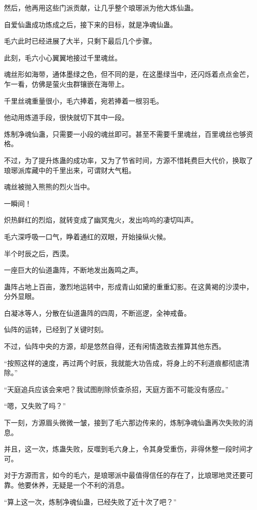 \begin{this_body}
然后，他再用这些门派贡献，让几乎整个琅琊派为他大炼仙蛊。

自爱仙蛊成功炼成之后，接下来的目标，就是净魂仙蛊。

毛六此时已经进展了大半，只剩下最后几个步骤。

此刻，毛六小心翼翼地接过千里魂丝。

魂丝形如海带，通体墨绿之色，但不同的是，在这墨绿当中，还闪烁着点点金芒，乍一看，仿佛是萤火虫群镶嵌在海带上。

千里丝魂重量很小，毛六捧着，宛若捧着一根羽毛。

他动用炼道手段，很快就切下其中一段。

炼制净魂仙蛊，只需要一小段的魂丝即可。甚至不需要千里魂丝，百里魂丝也够资格。

不过，为了提升炼蛊的成功率，又为了节省时间，方源不惜耗费巨大代价，换取了琅琊派库藏中的千里出来，可谓财大气粗。

魂丝被抛入熊熊的烈火当中。

一瞬间！

炽热鲜红的烈焰，就转变成了幽冥鬼火，发出呜呜的凄切叫声。

毛六深呼吸一口气，睁着通红的双眼，开始操纵火候。

半个时辰之后，西漠。

一座巨大的仙道蛊阵，不断地发出轰鸣之声。

蛊阵占地上百亩，激烈地运转中，形成青山如黛的重重幻影。在这黄褐的沙漠中，分外显眼。

白凝冰等人，分散在仙道蛊阵的四周，不断巡逻，全神戒备。

仙阵的运转，已经到了关键时刻。

不过，仙阵中央的方源，却是悠然自得，还有闲情逸致去推算其他东西。

“按照这样的速度，再过两个时辰，我就能大功告成，将身上的不利道痕都彻底清除。”

“天庭追兵应该会来吧？我试图削除侦查杀招，天庭方面不可能没有感应。”

“嗯，又失败了吗？”

下一刻，方源眉头微微一皱，接到了毛六那边传来的，炼制净魂仙蛊再次失败的消息。

并且，这一次，炼蛊失败，反噬到毛六身上，令其身受重伤，非得休整一段时间才可。

对于方源而言，如今的毛六，是琅琊派中最值得信任的存在了，比琅琊地灵还要可靠。他要休养，无疑是一个不利的消息。

“算上这一次，炼制净魂仙蛊，已经失败了近十次了吧？”


\end{this_body}

